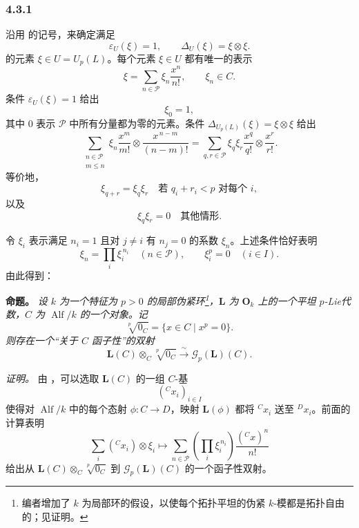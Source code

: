 
\subsubsection*{4.3.1}
\label{sga3:VIIB:4.3.1}

沿用  的记号，来确定满足
\[
  \varepsilon_U(\xi)=1,
  \qquad
  \Delta_U(\xi)=\xi\otimes\xi.
\]
的元素 \(\xi\in U=U_p(L)\)。每个元素 \(\xi\in U\) 都有唯一的表示
\[
  \xi
  =
  \sum_{n\in\mathcal P}
  \xi_n\frac{x^n}{n!},
  \qquad
  \xi_n\in C.
\]
条件 \(\varepsilon_U(\xi)=1\) 给出
\[
  \xi_0=1,
\]
其中 \(0\) 表示 \(\mathcal P\) 中所有分量都为零的元素。条件
\(\Delta_{U_p(L)}(\xi)=\xi\otimes\xi\) 给出
\[
  \sum_{\substack{n\in\mathcal P\\m\leq n}}
  \xi_n
  \frac{x^m}{m!}
  \otimes
  \frac{x^{\,n-m}}{(n-m)!}
  =
  \sum_{q,r\in\mathcal P}
  \xi_q\xi_r
  \frac{x^q}{q!}
  \otimes
  \frac{x^r}{r!}.
\]
等价地，
\[
  \xi_{q+r}=\xi_q\xi_r
  \quad\text{若 }q_i+r_i<p\text{ 对每个 }i,
\]
以及
\[
  \xi_q\xi_r=0
  \quad\text{其他情形}.
\]

令 \(\xi_i\) 表示满足 \(n_i=1\) 且对 \(j\ne i\) 有 \(n_j=0\) 的系数 \(\xi_n\)。上述条件恰好表明
\[
  \xi_n=\prod_i\xi_i^{\,n_i}
  \quad(n\in\mathcal P),
  \qquad
  \xi_i^p=0
  \quad(i\in I).
\]
由此得到：

\medskip
\noindent\textbf{命题。}
\label{sga3:VIIB:4.3.1:group-like-parametrization}
{\itshape 设 \(k\) 为一个特征为 \(p>0\) 的局部伪紧环\footnote{%
\label{sga3:VIIB:nde:137}编者增加了 \(k\) 为局部环的假设，以使每个拓扑平坦的伪紧 \(k\)-模都是拓扑自由的；见证明。}，\(\mathbf L\) 为 \(\mathbf O_k\) 上的一个平坦 \(p\)-Lie代数，\(C\) 为
\(\operatorname{Alf}/k\) 的一个对象。记
\[
  \sqrt[p]{0_C}
  =
  \{x\in C\mid x^p=0\}.
\]
则存在一个“关于 \(C\) 函子性”的双射
\[
  \mathbf L(C)\otimes_C\sqrt[p]{0_C}
  \xrightarrow{\ \sim\ }
  \mathscr G_p(\mathbf L)(C).
\]}

\textit{证明。}
由 ，可以选取
\(\mathbf L(C)\) 的一组 \(C\)-基
\[
  ({}^C x_i)_{i\in I}
\]
使得对 \(\operatorname{Alf}/k\) 中的每个态射 \(\phi:C\to D\)，映射
\(\mathbf L(\phi)\) 都将 \({}^C x_i\) 送至 \({}^D x_i\)。前面的计算表明
\[
  \sum_i({}^C x_i)\otimes\xi_i
  \longmapsto
  \sum_{n\in\mathcal P}
  \left(\prod_i\xi_i^{\,n_i}\right)
  \frac{({}^C x)^n}{n!}
\]
给出从 \(\mathbf L(C)\otimes_C\sqrt[p]{0_C}\) 到
\(\mathscr G_p(\mathbf L)(C)\) 的一个函子性双射。
